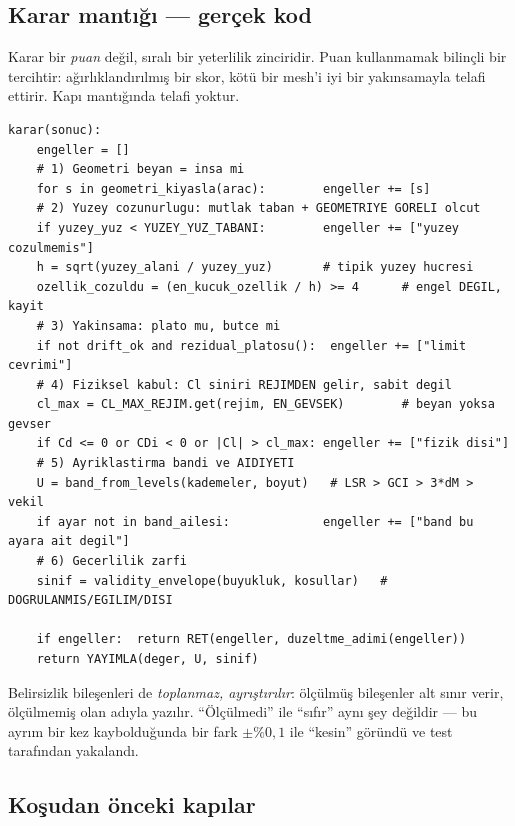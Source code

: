 \documentclass[11pt,a4paper]{article}
\begin{document}
\subsection{Karar mantığı --- gerçek kod}

Karar bir \emph{puan} değil, sıralı bir yeterlilik zinciridir. Puan kullanmamak
bilinçli bir tercihtir: ağırlıklandırılmış bir skor, kötü bir mesh'i iyi bir
yakınsamayla telafi ettirir. Kapı mantığında telafi yoktur.

\begin{lstlisting}
karar(sonuc):
    engeller = []
    # 1) Geometri beyan = insa mi
    for s in geometri_kiyasla(arac):        engeller += [s]
    # 2) Yuzey cozunurlugu: mutlak taban + GEOMETRIYE GORELI olcut
    if yuzey_yuz < YUZEY_YUZ_TABANI:        engeller += ["yuzey cozulmemis"]
    h = sqrt(yuzey_alani / yuzey_yuz)       # tipik yuzey hucresi
    ozellik_cozuldu = (en_kucuk_ozellik / h) >= 4      # engel DEGIL, kayit
    # 3) Yakinsama: plato mu, butce mi
    if not drift_ok and rezidual_platosu():  engeller += ["limit cevrimi"]
    # 4) Fiziksel kabul: Cl siniri REJIMDEN gelir, sabit degil
    cl_max = CL_MAX_REJIM.get(rejim, EN_GEVSEK)        # beyan yoksa gevser
    if Cd <= 0 or CDi < 0 or |Cl| > cl_max: engeller += ["fizik disi"]
    # 5) Ayriklastirma bandi ve AIDIYETI
    U = band_from_levels(kademeler, boyut)   # LSR > GCI > 3*dM > vekil
    if ayar not in band_ailesi:             engeller += ["band bu ayara ait degil"]
    # 6) Gecerlilik zarfi
    sinif = validity_envelope(buyukluk, kosullar)   # DOGRULANMIS/EGILIM/DISI

    if engeller:  return RET(engeller, duzeltme_adimi(engeller))
    return YAYIMLA(deger, U, sinif)
\end{lstlisting}

\noindent Belirsizlik bileşenleri de \emph{toplanmaz, ayrıştırılır}: ölçülmüş
bileşenler alt sınır verir, ölçülmemiş olan adıyla yazılır. ``Ölçülmedi'' ile
``sıfır'' aynı şey değildir --- bu ayrım bir kez kaybolduğunda bir fark
$\pm\%0{,}1$ ile ``kesin'' göründü ve test tarafından yakalandı.

\subsection{Koşudan önceki kapılar}
\end{document}
